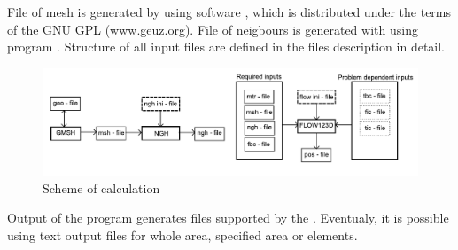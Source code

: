 File of  mesh is generated by using software , which is distributed under the terms of the GNU GPL (www.geuz.org). File of neigbours is generated with using program . Structure of all input files are defined in the files description in detail. 

 \begin{figure}[h]
    \begin{center}
      \includegraphics[scale=0.7]{schema.pdf} %
      \caption{Scheme of calculation}
      \label{obr3}
    \end{center}
  \end{figure}

Output of the program generates  files supported by the . Eventualy, it is possible using text output files for whole area, specified area or elements. 
